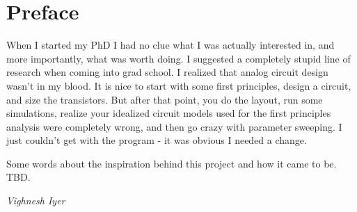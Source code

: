\chapter*{Preface}

When I started my PhD I had no clue what I was actually interested in, and more importantly, what was worth doing.
I suggested a completely stupid line of research when coming into grad school.
I realized that analog circuit design wasn't in my blood. It is nice to start with some first principles, design a circuit, and size the transistors. But after that point, you do the layout, run some simulations, realize your idealized circuit models used for the first principles analysis were completely wrong, and then go crazy with parameter sweeping. I just couldn't get with the program - it was obvious I needed a change.

Some words about the inspiration behind this project and how it came to be.
TBD.

\begin{flushright}
	\textit{Vighnesh Iyer}
\end{flushright}
